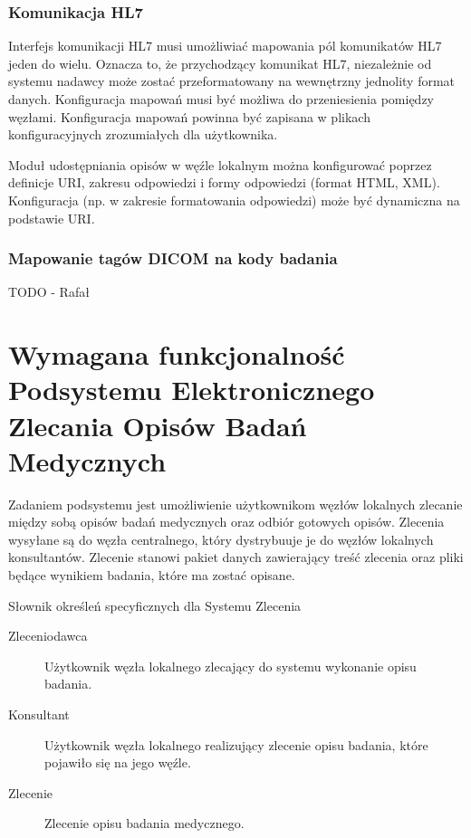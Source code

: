 \documentclass[a4paper]{report}
\begin{document}
\subsection{Komunikacja HL7}

Interfejs komunikacji HL7 musi umożliwiać mapowania pól komunikatów HL7 jeden do wielu. Oznacza to, że przychodzący komunikat HL7, niezależnie od systemu nadawcy może zostać przeformatowany na wewnętrzny jednolity format danych. Konfiguracja mapowań musi być możliwa do przeniesienia pomiędzy węzłami. Konfiguracja mapowań powinna być zapisana w plikach konfiguracyjnych zrozumiałych dla użytkownika.

Moduł udostępniania opisów w węźle lokalnym można konfigurować poprzez definicje URI, zakresu odpowiedzi i formy odpowiedzi (format HTML, XML). Konfiguracja (np. w zakresie formatowania odpowiedzi) może być dynamiczna na podstawie URI. 

\subsection{Mapowanie tagów DICOM na kody badania}

TODO - Rafał

\chapter[Podsystem Elektronicznego Zlecania Opisów Badań]{Wymagana funkcjonalność Podsystemu Elektronicznego Zlecania Opisów Badań Medycznych}

Zadaniem podsystemu jest umożliwienie użytkownikom węzłów lokalnych zlecanie między sobą opisów
badań medycznych oraz odbiór gotowych opisów. Zlecenia wysyłane są do węzła centralnego, który
dystrybuuje je do węzłów lokalnych konsultantów. Zlecenie stanowi pakiet danych zawierający
treść zlecenia oraz pliki będące wynikiem badania, które ma zostać opisane. 

Słownik określeń specyficznych dla Systemu Zlecenia
\begin{description}
  \item[Zleceniodawca] Użytkownik węzła lokalnego zlecający do systemu wykonanie opisu badania.
  \item[Konsultant] Użytkownik węzła lokalnego realizujący zlecenie opisu badania, które pojawiło się na jego węźle.
  \item[Zlecenie] Zlecenie opisu badania medycznego.
\end{description}
\end{document}
